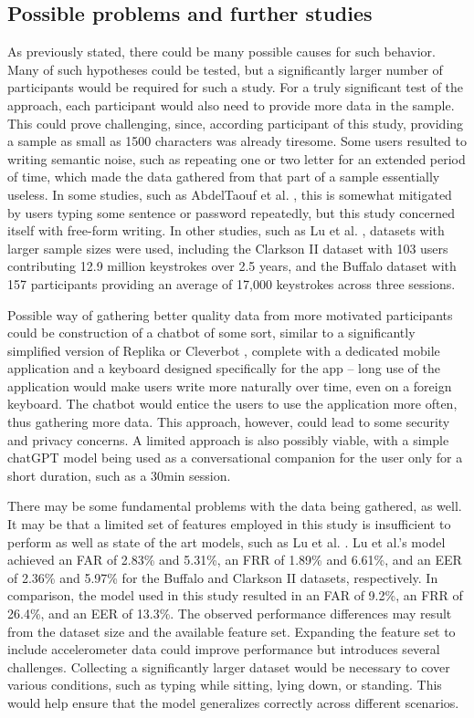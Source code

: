 \subsection{Possible problems and further studies}
As previously stated, there could be many possible causes for such behavior. Many of such hypotheses could be tested, but a significantly larger number of participants would be required for such a study. For a truly significant test of the approach, each participant would also need to provide more data in the sample. This could prove challenging, since, according participant of this study, providing a sample as small as 1500 characters was already tiresome. Some users resulted to writing semantic noise, such as repeating one or two letter for an extended period of time, which made the data gathered from that part of a sample essentially useless. In some studies, such as AbdelTaouf et al. \cite{Abde2023}, this is somewhat mitigated by users typing some sentence or password repeatedly, but this study concerned itself with free-form writing. In other studies, such as Lu et al. \cite{Lu2020}, datasets with larger sample sizes were used, including the Clarkson II dataset with 103 users contributing 12.9 million keystrokes over 2.5 years, and the Buffalo dataset with 157 participants providing an average of 17,000 keystrokes across three sessions.

Possible way of gathering better quality data from more motivated participants could be construction of a chatbot of some sort, similar to a significantly simplified version of Replika \cite{replika} or Cleverbot \cite{cleverbot}, complete with a dedicated mobile application and a keyboard designed specifically for the app -- long use of the application would make users write more naturally over time, even on a foreign keyboard. The chatbot would entice the users to use the application more often, thus gathering more data. This approach, however, could lead to some security and privacy concerns. A limited approach is also possibly viable, with a simple chatGPT model being used as a conversational companion for the user only for a short duration, such as a 30min session.

There may be some fundamental problems with the data being gathered, as well. It may be that a limited set of features employed in this study is insufficient to perform as well as state of the art models, such as Lu et al. \cite{Lu2020}. Lu et al.'s model achieved an FAR of 2.83\% and 5.31\%, an FRR of 1.89\% and 6.61\%, and an EER of 2.36\% and 5.97\% for the Buffalo and Clarkson II datasets, respectively. In comparison, the model used in this study resulted in an FAR of 9.2\%, an FRR of 26.4\%, and an EER of 13.3\%. The observed performance differences may result from the dataset size and the available feature set. Expanding the feature set to include accelerometer data could improve performance but introduces several challenges. Collecting a significantly larger dataset would be necessary to cover various conditions, such as typing while sitting, lying down, or standing. This would help ensure that the model generalizes correctly across different scenarios.

